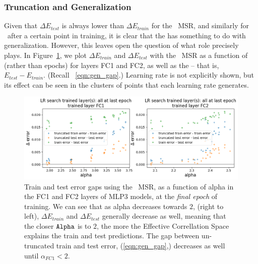 \subsubsection{Truncation and Generalization}

Given that $\Delta E_{test}$ is always lower than $\Delta E_{train}$ for the \POWERLAW~MSR, and similarly for \TRACELOG~after a certain point in training, it is clear that the \EffectiveCorrelationSpace has something to do with generalization.
However, this leaves open the question of what role precisely \ALPHA plays. 
In Figure~\ref{fig:mlp3-alpha-generalization-gap}, we plot $\Delta E_{train}$ and $\Delta E_{test}$ with the \POWERLAW~MSR as a function of \ALPHA (rather than epochs) for layers FC1 and FC2, as well as the \GeneralizationGap -- that is, $E_{test} - E_{train}$. 
(Recall \EQN~\ref{eqn:gen_gap}.) 
Learning rate is not explicitly shown, but its effect can be seen in the clusters of points that each learning rate generates.

\begin{figure}[t]
  \centering
  \includegraphics[width=15cm]{img/truncated_error/mlp3_trunc_error_by_LR_alpha_all_xmin.png}
  \caption{
        Train and test error gaps using the \POWERLAW~MSR, as a function of alpha in the FC1 and FC2 layers of MLP3 
        models, at the \emph{final epoch} of training. We can see that as alpha decreases towards $2$, (right to left), 
        $\Delta E_{train}$ and $\Delta E_{test}$ generally decrease as well, meaning that the closer $\texttt{Alpha}$ is to $2$, 
        the more the Effective Correllation Space explains the train and test predictions. The gap between un-truncated 
        train and test error, (\EQN \ref{eqn:gen_gap},) decreases as well until $\alpha_{FC1} < 2$.
  }
  \label{fig:mlp3-alpha-generalization-gap}
\end{figure}

